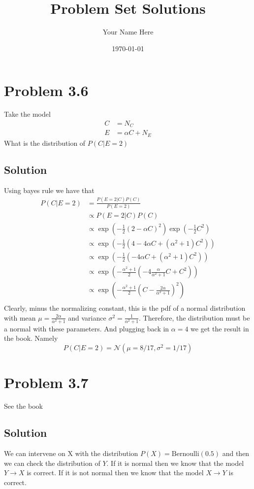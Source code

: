 \documentclass[11pt]{article}
\title{Problem Set Solutions}
\author{Your Name Here}
\date{\today}
\begin{document}
\maketitle

\section*{Problem 3.6}
Take the model 
\begin{align*}
    C &= N_C \\
    E &= \alpha C + N_E
\end{align*}
What is the distribution of $P(C | E = 2)$
\subsection*{Solution}
Using bayes rule we have that 
\begin{align*}
P(C | E = 2) &= \frac{P(E = 2 | C) P(C)}{P(E = 2)} \\
&\propto P(E = 2 | C) P(C) \\
&\propto \exp\left( -\frac{1}{2} (2 - \alpha C)^2 \right) \exp\left(-\frac{1}{2} C^2\right) \\
&\propto \exp\left( -\frac{1}{2} (4 - 4 \alpha C +  (\alpha^2 + 1) C^2) \right) \\
&\propto \exp\left( -\frac{1}{2} (- 4 \alpha C +  (\alpha^2 + 1) C^2) \right) \\
&\propto \exp\left( -\frac{\alpha ^2 + 1}{2 } (- 4 \frac{\alpha}{\alpha^2 + 1} C +  C^2) \right) \\
&\propto \exp\left( -\frac{\alpha ^2 + 1}{2 } \left(C -  \frac{2\alpha }{\alpha^2 + 1}\right)^2\right) \\
\end{align*}
Clearly, minus the normalizing constant, this is the pdf of a normal distribution with
 mean $\mu = \frac{2\alpha }{\alpha^2 + 1}$ and variance $\sigma^2 = \frac{1}{\alpha^2 + 1}$.
 Therefore, the distribution must be a normal with these parameters.
 And plugging back in $\alpha = 4$ we get the result in the book. Namely 
\[P(C | E = 2) = \mathcal{N}(\mu = 8/17, \sigma^2 = 1/17)\]

\section*{Problem 3.7}
See the book
\subsection*{Solution}
We can intervene on X with the distribution $P(X) = \text{Bernoulli}(0.5)$ and then we can check the distribution of $Y$.
If it is normal then we know that the model $Y \rightarrow X$ is correct. 
If it is not normal then we know that the model $X \rightarrow Y$ is correct.


\end{document}
